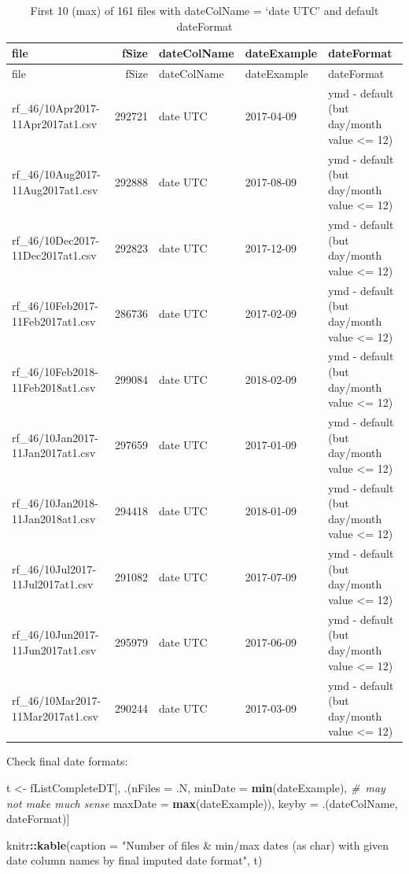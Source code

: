 \documentclass[]{article}
\newenvironment{Shaded}{\begin{snugshade}}{\end{snugshade}}
\newcommand{\KeywordTok}[1]{\textcolor[rgb]{0.13,0.29,0.53}{\textbf{#1}}}
\newcommand{\DataTypeTok}[1]{\textcolor[rgb]{0.13,0.29,0.53}{#1}}
\newcommand{\StringTok}[1]{\textcolor[rgb]{0.31,0.60,0.02}{#1}}
\newcommand{\CommentTok}[1]{\textcolor[rgb]{0.56,0.35,0.01}{\textit{#1}}}
\newcommand{\OperatorTok}[1]{\textcolor[rgb]{0.81,0.36,0.00}{\textbf{#1}}}
\newcommand{\NormalTok}[1]{#1}
\begin{document}
\begin{longtable}[]{@{}lrlll@{}}
\caption{First 10 (max) of 161 files with dateColName = `date UTC' and
default dateFormat}\tabularnewline
\toprule
file & fSize & dateColName & dateExample & dateFormat\tabularnewline
\midrule
\endfirsthead
\toprule
file & fSize & dateColName & dateExample & dateFormat\tabularnewline
\midrule
\endhead
rf\_46/10Apr2017-11Apr2017at1.csv & 292721 & date UTC & 2017-04-09 & ymd
- default (but day/month value \textless{}= 12)\tabularnewline
rf\_46/10Aug2017-11Aug2017at1.csv & 292888 & date UTC & 2017-08-09 & ymd
- default (but day/month value \textless{}= 12)\tabularnewline
rf\_46/10Dec2017-11Dec2017at1.csv & 292823 & date UTC & 2017-12-09 & ymd
- default (but day/month value \textless{}= 12)\tabularnewline
rf\_46/10Feb2017-11Feb2017at1.csv & 286736 & date UTC & 2017-02-09 & ymd
- default (but day/month value \textless{}= 12)\tabularnewline
rf\_46/10Feb2018-11Feb2018at1.csv & 299084 & date UTC & 2018-02-09 & ymd
- default (but day/month value \textless{}= 12)\tabularnewline
rf\_46/10Jan2017-11Jan2017at1.csv & 297659 & date UTC & 2017-01-09 & ymd
- default (but day/month value \textless{}= 12)\tabularnewline
rf\_46/10Jan2018-11Jan2018at1.csv & 294418 & date UTC & 2018-01-09 & ymd
- default (but day/month value \textless{}= 12)\tabularnewline
rf\_46/10Jul2017-11Jul2017at1.csv & 291082 & date UTC & 2017-07-09 & ymd
- default (but day/month value \textless{}= 12)\tabularnewline
rf\_46/10Jun2017-11Jun2017at1.csv & 295979 & date UTC & 2017-06-09 & ymd
- default (but day/month value \textless{}= 12)\tabularnewline
rf\_46/10Mar2017-11Mar2017at1.csv & 290244 & date UTC & 2017-03-09 & ymd
- default (but day/month value \textless{}= 12)\tabularnewline
\bottomrule
\end{longtable}

Check final date formats:

\begin{Shaded}
\begin{Highlighting}[]
\NormalTok{t <-}\StringTok{ }\NormalTok{fListCompleteDT[, .(}\DataTypeTok{nFiles =}\NormalTok{ .N, }
                         \DataTypeTok{minDate =} \KeywordTok{min}\NormalTok{(dateExample), }\CommentTok{# may not make much sense}
                         \DataTypeTok{maxDate =} \KeywordTok{max}\NormalTok{(dateExample)), keyby =}\StringTok{ }\NormalTok{.(dateColName, dateFormat)]}

\NormalTok{knitr}\OperatorTok{::}\KeywordTok{kable}\NormalTok{(}\DataTypeTok{caption =} \StringTok{"Number of files & min/max dates (as char) with given date column names by final imputed date format"}\NormalTok{, t)}
\end{Highlighting}
\end{Shaded}
\end{document}
